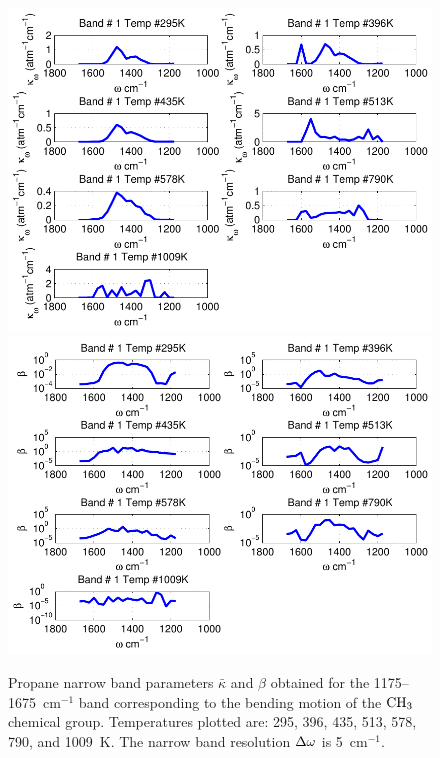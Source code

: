 \begin{figure}[p]
\begin{center}
\includegraphics[width=5.0in]{Figures/Propane_Kappa_Band1_MALKMUS.pdf}
\includegraphics[width=5.0in]{Figures/Propane_Beta_Band1_MALKMUS.pdf}
\end{center}
\caption{Propane narrow band parameters $\bar{\kappa}$ and $\beta$ obtained for the 1175--1675~cm$^{-1}$ band corresponding to the bending motion of the $\rm CH_3$ chemical group. Temperatures plotted are: 295, 396, 435, 513, 578, 790, and 1009~K. The narrow band resolution $\Delta \omega$ is 5~cm$^{-1}$.\label{fig:propane_kappa_beta1}}
\end{figure}

